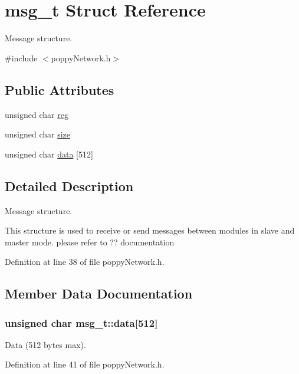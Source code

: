 \hypertarget{structmsg__t}{\section{msg\-\_\-t Struct Reference}
\label{structmsg__t}
}


Message structure.  




{\ttfamily \#include $<$poppy\-Network.\-h$>$}

\subsection*{Public Attributes}
\begin{DoxyCompactItemize}
\item 
unsigned char \hyperlink{structmsg__t_a0aef01fbaf575c639d82d5beee92c421}{reg}
\item 
unsigned char \hyperlink{structmsg__t_a3736f2ca203e665223b225ca07def9b5}{size}
\item 
unsigned char \hyperlink{structmsg__t_ab11ea949abe5142d3e5c5911cf971860}{data} \mbox{[}512\mbox{]}
\end{DoxyCompactItemize}


\subsection{Detailed Description}
Message structure. 

This structure is used to receive or send messages between modules in slave and master mode. please refer to ?? documentation 

Definition at line 38 of file poppy\-Network.\-h.



\subsection{Member Data Documentation}
\hypertarget{structmsg__t_ab11ea949abe5142d3e5c5911cf971860}{
\subsubsection[{data}]{\setlength{\rightskip}{0pt plus 5cm}unsigned char msg\-\_\-t\-::data\mbox{[}512\mbox{]}}}\label{structmsg__t_ab11ea949abe5142d3e5c5911cf971860}
Data (512 bytes max). 

Definition at line 41 of file poppy\-Network.\-h.


